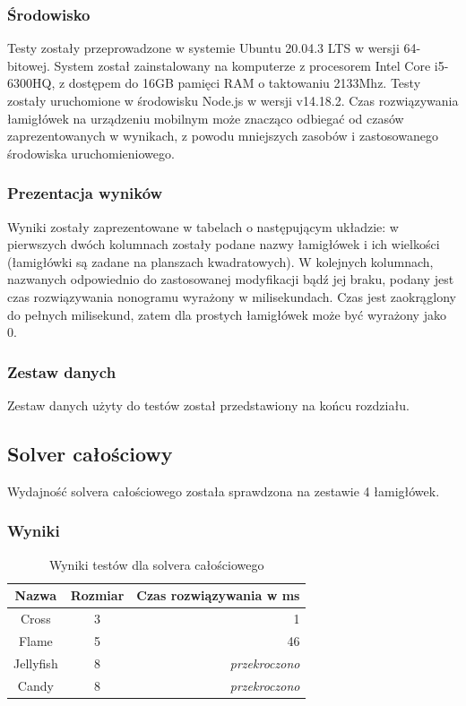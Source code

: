 \subsubsection{Środowisko}
    Testy zostały przeprowadzone w systemie Ubuntu 20.04.3 LTS w wersji 64-bitowej.
System został zainstalowany na komputerze z procesorem Intel Core i5-6300HQ, z dostępem do
16GB pamięci RAM o taktowaniu 2133Mhz. Testy zostały uruchomione w środowisku Node.js \cite{node}
w wersji v14.18.2. Czas rozwiązywania łamigłówek na urządzeniu mobilnym może znacząco odbiegać
od czasów zaprezentowanych w wynikach, z powodu mniejszych zasobów i zastosowanego środowiska
uruchomieniowego.

\subsubsection{Prezentacja wyników}
    Wyniki zostały zaprezentowane w tabelach o następującym układzie: w pierwszych dwóch kolumnach
zostały podane nazwy łamigłówek i ich wielkości (łamigłówki są zadane na planszach kwadratowych).
W kolejnych kolumnach, nazwanych odpowiednio do zastosowanej modyfikacji bądź jej braku,
podany jest czas rozwiązywania nonogramu wyrażony w milisekundach. Czas jest zaokrąglony do pełnych
milisekund, zatem dla prostych łamigłówek może być wyrażony jako 0.

\subsubsection{Zestaw danych}
    Zestaw danych użyty do testów został przedstawiony na końcu rozdziału.


\subsection{Solver całościowy}
    Wydajność solvera całościowego została sprawdzona na zestawie 4 łamigłówek.

\subsubsection{Wyniki}
\begin{table}[h!]
    \begin{center}
        \begin{tabular}{|c|c|r|}
            \hline
            Nazwa          & Rozmiar        & Czas rozwiązywania w ms \\
            \hline
            Cross       & 3 & 1                     \\
            Flame       & 5 & 46                    \\
            Jellyfish   & 8 & \textit{przekroczono} \\
            Candy       & 8 & \textit{przekroczono} \\
            \hline
        \end{tabular}
    \end{center}
    \caption{Wyniki testów dla solvera całościowego}
\end{table}

